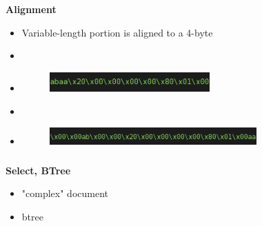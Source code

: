 \documentclass[usenames,dvipsnames, 18pt, compress, aspectratio=169]{beamer}
\begin{document}
\begin{frame}
    \frametitle{}
    \begin{center}
    \textbf{Alignment}

    \begin{itemize}[label={}]
        \item Variable-length portion is aligned to a 4-byte
        \item \inputminted[fontsize=\Large]{sql}{sql/insert_align1.sql}
        \item \begin{figure}
            \includegraphics[width=0.58\textwidth,left]{align_short.png}
        \end{figure}

        \item \inputminted[fontsize=\Large]{sql}{sql/insert_align2.sql}
        \item \begin{figure}
            \includegraphics[width=0.75\textwidth,left]{align_long.png}
        \end{figure}

    \end{itemize}

    \end{center}
\end{frame}

\begin{frame}
    \frametitle{}
    \begin{center}
        \textbf{Select, BTree}
        \begin{itemize}[label={}]
            \item "complex" document
            \item btree
        \end{itemize}
    \end{center}
\end{frame}
\end{document}
